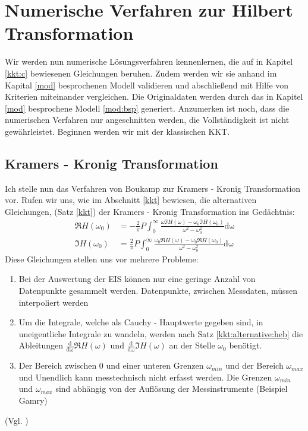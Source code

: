 \chapter{Numerische Verfahren zur Hilbert Transformation}\label{num}
Wir werden nun numerische Lösungsverfahren kennenlernen, die auf in Kapitel \ref{kkt:c} bewiesenen Gleichungen beruhen. Zudem werden wir sie anhand im Kapital \ref{mod} besprochenen Modell validieren und abschließend mit Hilfe von Kriterien miteinander vergleichen. Die Originaldaten werden durch das in Kapitel \ref{mod} besprochene Modell \ref{mod:bsp} generiert. Anzumerken ist noch, dass die numerischen Verfahren nur angeschnitten werden, die Vollständigkeit ist nicht gewährleistet. Beginnen werden wir mit der klassischen KKT.
\section{Kramers - Kronig Transformation}\label{kkt:num}
Ich stelle nun das Verfahren von Boukamp \cite{Boukamp1993} zur Kramers - Kronig Transformation vor.
Rufen wir uns, wie im Abschnitt \ref{kkt} bewiesen, die alternativen Gleichungen, (Satz \ref{kkt}) der Kramers - Kronig  Transformation ins Gedächtnis:
\begin{align}
\Re{H(\omega_0)} &= -\frac{2}{\pi} P \int_0^{\infty} \frac{\omega \Im{H(\omega)}-\omega_0 \Im{H(\omega_0)}}{\omega^2 - \omega^2_0} \mathrm{d\omega}\label{num:kkt:re}\\
	\Im{H(\omega_0)} &= \frac{2}{\pi} P \int_0^{\infty} \frac{\omega_0 \Re{H(\omega)} - \omega_0 \Re{H(\omega_0)}}{\omega^2 - \omega^2_0} \mathrm{d\omega} \label{num:kkt:im}
\end{align}
Diese Gleichungen stellen uns vor mehrere Probleme:
\begin{enumerate}
\item Bei der Auswertung der EIS können nur eine geringe Anzahl von Datenpunkte gesammelt werden. Datenpunkte, zwischen Messdaten, müssen interpoliert werden\label{num:kkt:prob1}
\item Um die Integrale, welche als Cauchy - Hauptwerte gegeben sind, in uneigentliche Integrale zu wandeln, werden nach Satz \ref{kkt:alternative:heb} die Ableitungen $\frac{\mathrm{d}}{\mathrm{d\omega}} \Re{H(\omega)}$ und $\frac{\mathrm{d}}{\mathrm{d\omega}} \Im{H(\omega)}$ an der Stelle $\omega_0$ benötigt. \label{num:kkt:prob2}
\item Der Bereich zwischen $0$ und einer unteren Grenzen $\omega_{min}$ und der Bereich $\omega_{max}$ und Unendlich kann messtechnisch nicht erfasst werden. Die Grenzen $\omega_{min}$ und $\omega_{max}$ sind abhängig von der Auflösung der Messinstrumente (Beispiel Gamry)
\end{enumerate} (Vgl. \cite{Boukamp1993})
